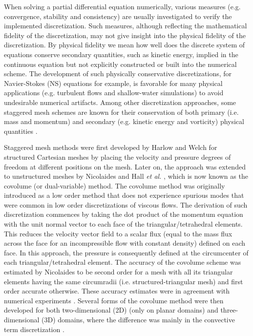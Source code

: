 \documentclass[final,12pt,times]{elsarticle}
\begin{document}
When solving a partial differential equation numerically, various measures (e.g. convergence, stability and consistency) are usually investigated to verify the implemented discretization. Such measures, although reflecting the mathematical fidelity of the discretization, may not give insight into the physical fidelity of the discretization. By physical fidelity we mean how well does the discrete system of equations conserve secondary quantities, such as kinetic energy, implied in the continuous equation but not explicitly constructed or built into the numerical scheme. The development of such physically conservative discretizations, for Navier-Stokes (NS) equations for example, is favorable for many physical applications (e.g. turbulent flows and shallow-water simulations) to avoid undesirable numerical artifacts. Among other discretization approaches, some staggered mesh schemes are known for their conservation of both primary (i.e. mass and momentum) and secondary (e.g. kinetic energy and vorticity) physical quantities \cite{Perot:2011dcpums}.  

Staggered mesh methods were first developed by Harlow and Welch \cite{HarlowWelch:1965} for structured Cartesian meshes by placing the velocity and pressure degrees of freedom at different positions on the mesh. Later on, the approach was extended to unstructured meshes by Nicolaides \cite{nicolaides:1989flow} and Hall \textit{et al.} \cite{HallCavendish:1991dvmsvf}, which is now known as the covolume (or dual-variable) method. The covolume method was originally introduced as a low order method that does not experience spurious modes that were common in low order discretizations of viscous flows. The derivation of such discretization commences by taking the dot product of the momentum equation with the unit normal vector to each face of the triangular/tetrahedral elements. This reduces the velocity vector field to a scalar flux (equal to the mass flux across the face for an incompressible flow with constant density) defined on each face. In this approach, the pressure is consequently defined at the circumcenter of each triangular/tetrahedral element. The accuracy of the covolume scheme was estimated by Nicolaides \cite{nicolaides:1992direct} to be second order for a mesh with all its triangular elements having the same circumradii (i.e. structured-triangular mesh) and first order accurate otherwise. These accuracy estimates were in agreement with numerical experiments \cite{HallCavendish:1991dvmsvf}. Several forms of the covolume method were then developed for both two-dimensional (2D) (only on planar domains) and three-dimensional (3D) domains, where the difference was mainly in the convective term discretization \cite{cavendish1992solution,cavendish1994complementary,choudhury1990discretization,nicolaides1993covolume}. 
\end{document}
